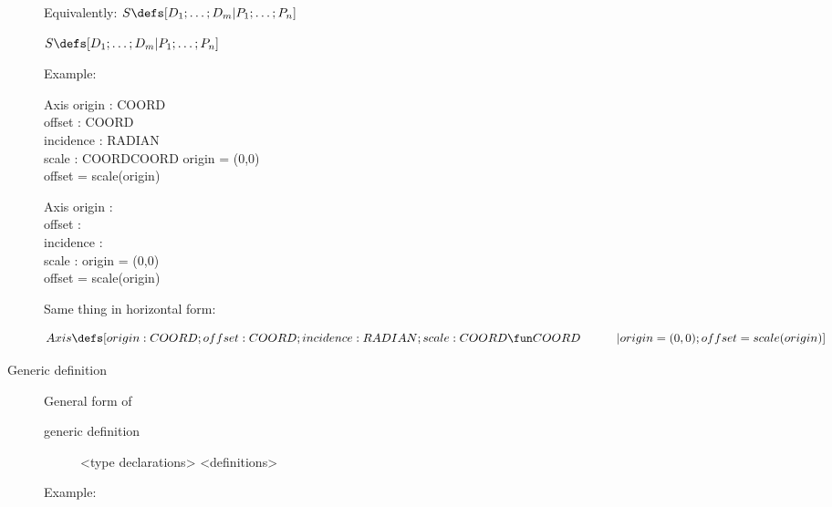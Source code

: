 \documentclass[12pt]{tufte-handout}
\numberwithin{equation}{subsection}
\numberwithin{equation}{subsection}
\begin{document}
\begin{description}
  \noindent Equivalently: \(S\defs [D_1;\ldots ;D_m | P_1;\ldots ;P_n]\)
  \begin{marginfigure}
    \(S\defs [D_1;\ldots ;D_m | P_1;\ldots ;P_n]\)
  \end{marginfigure}

  Example:

  \begin{marginfigure}[24pt]
    \begin{schema}{Axis}
      origin : COORD \\
      offset : COORD \\
      incidence : RADIAN \\
      scale : COORD\fun COORD
      \where
      origin = (0,0) \\
      offset = scale(origin)
    \end{schema}
  \end{marginfigure}
  \begin{schema}{Axis}
    origin : \real\cross\real \\
    offset : \real\cross\real \\
    incidence : \real \\
    scale : \real\fun\real
    \where
    origin = (0,0) \\
    offset = scale(origin)
  \end{schema}

  Same thing in horizontal form:

  \[Axis \defs [origin:COORD;offset:COORD;incidence:RADIAN;scale:COORD\fun COORD \\
    \quad\quad\quad | origin=(0,0); offset=scale(origin)]\]

\item[Generic definition]

  General form of

  \begin{description}
  \item [generic definition]
    \begin{gendef}[X,Y]
      <type declarations>
      \where
      <definitions>
    \end{gendef}
  \end{description}

  Example:


\end{description}
\end{document}
